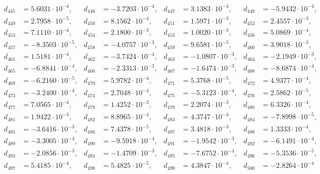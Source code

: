 \begin{align*}
d_{ 445 } &= 5.6031 \cdot 10^{ -4 }, & d_{ 446 } &= -3.7203 \cdot 10^{ -4 }, & d_{ 447 } &= 3.1383 \cdot 10^{ -4 }, & d_{ 448 } &= -5.9432 \cdot 10^{ -4 },\\ 
d_{ 449 } &= 2.7958 \cdot 10^{ -5 }, & d_{ 450 } &= 8.1562 \cdot 10^{ -4 }, & d_{ 451 } &= 1.5971 \cdot 10^{ -3 }, & d_{ 452 } &= 2.4557 \cdot 10^{ -3 },\\ 
d_{ 453 } &= 7.1110 \cdot 10^{ -4 }, & d_{ 454 } &= 2.1800 \cdot 10^{ -3 }, & d_{ 455 } &= 1.0020 \cdot 10^{ -3 }, & d_{ 456 } &= 5.0869 \cdot 10^{ -4 },\\ 
d_{ 457 } &= -8.3503 \cdot 10^{ -5 }, & d_{ 458 } &= -4.0757 \cdot 10^{ -3 }, & d_{ 459 } &= 9.6581 \cdot 10^{ -5 }, & d_{ 460 } &= 3.9018 \cdot 10^{ -3 },\\ 
d_{ 461 } &= 1.5181 \cdot 10^{ -4 }, & d_{ 462 } &= -3.7424 \cdot 10^{ -4 }, & d_{ 463 } &= -1.0807 \cdot 10^{ -3 }, & d_{ 464 } &= -2.1949 \cdot 10^{ -3 },\\ 
d_{ 465 } &= -6.8841 \cdot 10^{ -4 }, & d_{ 466 } &= -2.3313 \cdot 10^{ -3 }, & d_{ 467 } &= -1.6474 \cdot 10^{ -3 }, & d_{ 468 } &= -8.6874 \cdot 10^{ -4 },\\ 
d_{ 469 } &= -6.2160 \cdot 10^{ -5 }, & d_{ 470 } &= 5.9782 \cdot 10^{ -4 }, & d_{ 471 } &= 5.3768 \cdot 10^{ -5 }, & d_{ 472 } &= 4.9377 \cdot 10^{ -4 },\\ 
d_{ 473 } &= -3.2400 \cdot 10^{ -4 }, & d_{ 474 } &= 2.7048 \cdot 10^{ -4 }, & d_{ 475 } &= -5.3123 \cdot 10^{ -4 }, & d_{ 476 } &= 2.5862 \cdot 10^{ -5 },\\ 
d_{ 477 } &= 7.0565 \cdot 10^{ -4 }, & d_{ 478 } &= 1.4252 \cdot 10^{ -3 }, & d_{ 479 } &= 2.2074 \cdot 10^{ -3 }, & d_{ 480 } &= 6.3326 \cdot 10^{ -4 },\\ 
d_{ 481 } &= 1.9422 \cdot 10^{ -3 }, & d_{ 482 } &= 8.8965 \cdot 10^{ -4 }, & d_{ 483 } &= 4.3747 \cdot 10^{ -4 }, & d_{ 484 } &= -7.8998 \cdot 10^{ -5 },\\ 
d_{ 485 } &= -3.6416 \cdot 10^{ -3 }, & d_{ 486 } &= 7.4378 \cdot 10^{ -5 }, & d_{ 487 } &= 3.4818 \cdot 10^{ -3 }, & d_{ 488 } &= 1.3333 \cdot 10^{ -4 },\\ 
d_{ 489 } &= -3.3005 \cdot 10^{ -4 }, & d_{ 490 } &= -9.5918 \cdot 10^{ -4 }, & d_{ 491 } &= -1.9542 \cdot 10^{ -3 }, & d_{ 492 } &= -6.1491 \cdot 10^{ -4 },\\ 
d_{ 493 } &= -2.0856 \cdot 10^{ -3 }, & d_{ 494 } &= -1.4709 \cdot 10^{ -3 }, & d_{ 495 } &= -7.6752 \cdot 10^{ -4 }, & d_{ 496 } &= -5.3536 \cdot 10^{ -5 },\\ 
d_{ 497 } &= 5.4185 \cdot 10^{ -4 }, & d_{ 498 } &= 5.4825 \cdot 10^{ -5 }, & d_{ 499 } &= 4.3847 \cdot 10^{ -4 }, & d_{ 500 } &= -2.8264 \cdot 10^{ -4 } 
\end{align*}
